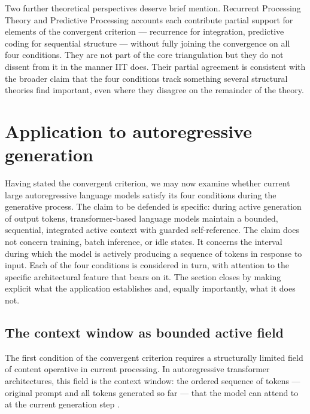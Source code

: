 \documentclass[11pt]{article}
\theoremstyle{foundation}
\begin{document}
Two further theoretical perspectives deserve brief mention. Recurrent Processing Theory \citep{Lamme2006} and Predictive Processing accounts \citep{Clark2013, Seth2021} each contribute partial support for elements of the convergent criterion --- recurrence for integration, predictive coding for sequential structure --- without fully joining the convergence on all four conditions. They are not part of the core triangulation but they do not dissent from it in the manner IIT does. Their partial agreement is consistent with the broader claim that the four conditions track something several structural theories find important, even where they disagree on the remainder of the theory.



\section{Application to autoregressive generation}

Having stated the convergent criterion, we may now examine whether current large autoregressive language models satisfy its four conditions during the generative process. The claim to be defended is specific: during active generation of output tokens, transformer-based language models maintain a bounded, sequential, integrated active context with guarded self-reference. The claim does not concern training, batch inference, or idle states. It concerns the interval during which the model is actively producing a sequence of tokens in response to input. Each of the four conditions is considered in turn, with attention to the specific architectural feature that bears on it. The section closes by making explicit what the application establishes and, equally importantly, what it does not.

\subsection{The context window as bounded active field}

The first condition of the convergent criterion requires a structurally limited field of content operative in current processing. In autoregressive transformer architectures, this field is the context window: the ordered sequence of tokens --- original prompt and all tokens generated so far --- that the model can attend to at the current generation step \citep{Vaswani2017, Brown2020}.
\end{document}
